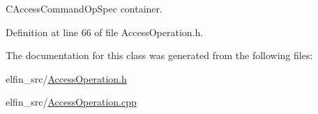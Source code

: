 C\-Access\-Command\-Op\-Spec container. 



Definition at line 66 of file Access\-Operation.\-h.



The documentation for this class was generated from the following files\-:\begin{DoxyCompactItemize}
\item 
elfin\-\_\-src/\hyperlink{_access_operation_8h}{Access\-Operation.\-h}\item 
elfin\-\_\-src/\hyperlink{_access_operation_8cpp}{Access\-Operation.\-cpp}\end{DoxyCompactItemize}
